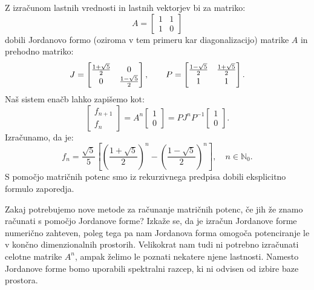 \documentclass[mat1]{fmfdelo}
\newcommand{\N}{\mathbb N}
\begin{document}
\begin{zgled} 
    Z izračunom lastnih vrednosti in lastnih vektorjev bi za matriko:
    \begin{equation*}
        A = 
        \begin{bmatrix}
            1 & 1 \\
            1 & 0
        \end{bmatrix}
    \end{equation*}
    dobili Jordanovo formo (oziroma v tem primeru kar diagonalizacijo) matrike $A$ in prehodno matriko:
    \begin{equation*}
        J = 
        \begin{bmatrix}
                \frac{1+\sqrt{5}}{2} & 0 \\
            0 &  \frac{1-\sqrt{5}}{2}
        \end{bmatrix}
        ,\quad \quad
        P = 
        \begin{bmatrix}
            \frac{1-\sqrt{5}}{2} &  \frac{1+\sqrt{5}}{2} \vspace{2pt} \\
            1 & 1
        \end{bmatrix}.
    \end{equation*}
    Naš sistem enačb lahko zapišemo kot:
    \begin{equation*}
        \begin{bmatrix}
            f_{n+1} \\
            f_n
        \end{bmatrix}
        =
        A^n
        \begin{bmatrix}
            1 \\
            0
        \end{bmatrix}
        = PJ^n P^{-1}
        \begin{bmatrix}
            1 \\
            0
        \end{bmatrix}.
    \end{equation*}
    Izračunamo, da je:
    \begin{equation*}
        f_n = \frac{\sqrt{5}}{5}\left[ \left(\frac{1+\sqrt{5}}{2}\right)^n - \left(\frac{1-\sqrt{5}}{2}\right)^n \right], \quad n \in \N_0.
    \end{equation*}
    S pomočjo matričnih potenc smo iz rekurzivnega predpisa dobili eksplicitno formulo zaporedja.
\end{zgled}

Zakaj potrebujemo nove metode za računanje matričnih potenc, če jih že znamo računati s pomočjo Jordanove forme? Izkaže se, da je izračun Jordanove forme numerično zahteven, poleg tega pa nam Jordanova forma omogoča potenciranje le v končno dimenzionalnih prostorih. Velikokrat nam tudi ni potrebno izračunati celotne matrike $A^n$, ampak želimo le poznati nekatere njene lastnosti. Namesto Jordanove forme bomo uporabili spektralni razcep, ki ni odvisen od izbire baze prostora.
\end{document}
